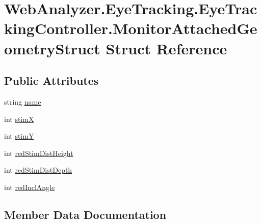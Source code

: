 \hypertarget{struct_web_analyzer_1_1_eye_tracking_1_1_eye_tracking_controller_1_1_monitor_attached_geometry_struct}{}\section{Web\+Analyzer.\+Eye\+Tracking.\+Eye\+Tracking\+Controller.\+Monitor\+Attached\+Geometry\+Struct Struct Reference}
\label{struct_web_analyzer_1_1_eye_tracking_1_1_eye_tracking_controller_1_1_monitor_attached_geometry_struct}
\subsection*{Public Attributes}
\begin{DoxyCompactItemize}
\item 
string \hyperlink{struct_web_analyzer_1_1_eye_tracking_1_1_eye_tracking_controller_1_1_monitor_attached_geometry_struct_ab922e958cb3a6b216c29027908d248a0}{name}
\item 
int \hyperlink{struct_web_analyzer_1_1_eye_tracking_1_1_eye_tracking_controller_1_1_monitor_attached_geometry_struct_ad1f1c7a068c4900c1d03436441473b6e}{stim\+X}
\item 
int \hyperlink{struct_web_analyzer_1_1_eye_tracking_1_1_eye_tracking_controller_1_1_monitor_attached_geometry_struct_a0d4f9e13c008494155446587f41df63e}{stim\+Y}
\item 
int \hyperlink{struct_web_analyzer_1_1_eye_tracking_1_1_eye_tracking_controller_1_1_monitor_attached_geometry_struct_ae3e8cd0234500bf3bbdc01aeea3e1ce8}{red\+Stim\+Dist\+Height}
\item 
int \hyperlink{struct_web_analyzer_1_1_eye_tracking_1_1_eye_tracking_controller_1_1_monitor_attached_geometry_struct_abb6a7c560d31ed5b71602cce563fee35}{red\+Stim\+Dist\+Depth}
\item 
int \hyperlink{struct_web_analyzer_1_1_eye_tracking_1_1_eye_tracking_controller_1_1_monitor_attached_geometry_struct_a4f7dc64aebc0d3ec4e4bc420fd53677e}{red\+Incl\+Angle}
\end{DoxyCompactItemize}


\subsection{Member Data Documentation}
\hypertarget{struct_web_analyzer_1_1_eye_tracking_1_1_eye_tracking_controller_1_1_monitor_attached_geometry_struct_ab922e958cb3a6b216c29027908d248a0}{}
